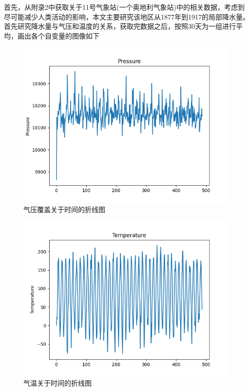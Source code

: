 \documentclass[UTF8, a4paper]{ctexart}
\begin{document}
首先，从附录2中获取关于11号气象站(一个奥地利气象站)中的相关数据，考虑到尽可能减少人类活动的影响，本文主要研究该地区从1877年到1917的局部降水量。首先研究降水量与气压和温度的关系，获取完数据之后，按照$30$天为一组进行平均，画出各个自变量的图像如下
\begin{figure}[h!]
	\centering
	\includegraphics[scale=0.5]{pp.png}
	\caption{气压覆盖关于时间的折线图}
\end{figure}


\begin{figure}[h!]
	\centering
	\includegraphics[scale=0.5]{tg.png}
	\caption{气温关于时间的折线图}
\end{figure}
\end{document}
